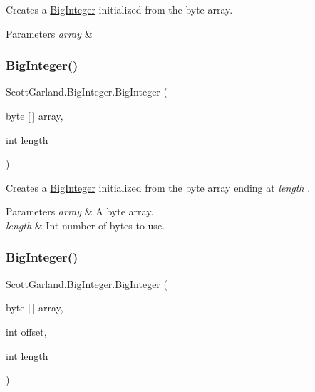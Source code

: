 Creates a \hyperlink{class_scott_garland_1_1_big_integer}{Big\+Integer} initialized from the byte array. 


\begin{DoxyParams}{Parameters}
{\em array} & \\
\hline
\end{DoxyParams}
\mbox{\label{class_scott_garland_1_1_big_integer_a018f88f4c41760ccc0c7c76e1e6794a9}} 
\subsubsection{\texorpdfstring{Big\+Integer()}{BigInteger()}\hspace{0.1cm}{\footnotesize\ttfamily [5/8]}}
{\footnotesize\ttfamily Scott\+Garland.\+Big\+Integer.\+Big\+Integer (\begin{DoxyParamCaption}\item[{byte \mbox{[}$\,$\mbox{]}}]{array,  }\item[{int}]{length }\end{DoxyParamCaption})\hspace{0.3cm}{\ttfamily [inline]}}



Creates a \hyperlink{class_scott_garland_1_1_big_integer}{Big\+Integer} initialized from the byte array ending at {\itshape length} . 


\begin{DoxyParams}{Parameters}
{\em array} & A byte array.\\
\hline
{\em length} & Int number of bytes to use.\\
\hline
\end{DoxyParams}
\mbox{\label{class_scott_garland_1_1_big_integer_aaee24d2962eea848eaa86c7607676b8b}} 
\subsubsection{\texorpdfstring{Big\+Integer()}{BigInteger()}\hspace{0.1cm}{\footnotesize\ttfamily [6/8]}}
{\footnotesize\ttfamily Scott\+Garland.\+Big\+Integer.\+Big\+Integer (\begin{DoxyParamCaption}\item[{byte \mbox{[}$\,$\mbox{]}}]{array,  }\item[{int}]{offset,  }\item[{int}]{length }\end{DoxyParamCaption})\hspace{0.3cm}{\ttfamily [inline]}}



